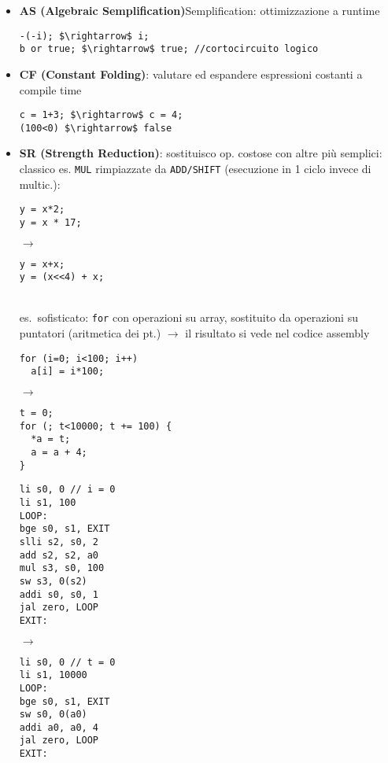 \begin{itemize}
  \item \textbf{AS (Algebraic Semplification)}Semplification: ottimizzazione a runtime
  \begin{lstlisting}
-(-i); $\rightarrow$ i;
b or true; $\rightarrow$ true; //cortocircuito logico\end{lstlisting}
  \item \textbf{CF (Constant Folding)}:  valutare ed espandere espressioni costanti a compile time
  \begin{lstlisting}
c = 1+3; $\rightarrow$ c = 4;
(100<0) $\rightarrow$ false\end{lstlisting}
  
  \item \textbf{SR (Strength Reduction)}: sostituisco op. costose con altre pi\`u semplici: classico es. \lstinline|MUL| rimpiazzate da \lstinline|ADD/SHIFT| (esecuzione in 1 ciclo invece di multic.):\\
  \begin{minipage}[c]{.4\textwidth}
  \begin{lstlisting}
y = x*2;
y = x * 17;\end{lstlisting}
  \end{minipage}
  \hfill
  $\rightarrow$
  \hfill
  \begin{minipage}[c]{.4\textwidth}
  \begin{lstlisting}
y = x+x;
y = (x<<4) + x;\end{lstlisting}
  \end{minipage}\\
  es.~sofisticato: \lstinline|for| con operazioni su array, sostituito da operazioni su puntatori (aritmetica dei pt.) $\rightarrow$ il risultato si vede nel codice assembly\\
  \begin{minipage}[c]{.4\textwidth}
  \begin{lstlisting}
for (i=0; i<100; i++)
  a[i] = i*100;
  \end{lstlisting} 
  \end{minipage}
  \hfill
$\rightarrow$
  \hfill
  \begin{minipage}[c]{.4\textwidth}
  \begin{lstlisting}
t = 0;
for (; t<10000; t += 100) {
  *a = t;
  a = a + 4;
}\end{lstlisting}
  \end{minipage}
  
  \begin{minipage}[c]{.4\textwidth}
  \begin{lstlisting}
li s0, 0 // i = 0
li s1, 100
LOOP:
bge s0, s1, EXIT
slli s2, s0, 2
add s2, s2, a0
mul s3, s0, 100
sw s3, 0(s2)
addi s0, s0, 1
jal zero, LOOP
EXIT:\end{lstlisting} 
  \end{minipage}
  \hfill
$\rightarrow$
  \hfill
  \begin{minipage}[c]{.4\textwidth}
  \begin{lstlisting}
li s0, 0 // t = 0
li s1, 10000
LOOP:
bge s0, s1, EXIT
sw s0, 0(a0)
addi a0, a0, 4
jal zero, LOOP
EXIT:\end{lstlisting}
  \end{minipage}
  

\end{itemize}
